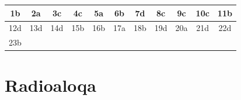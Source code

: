 \begin{table}[!ht]
\centering
\begin{tabular}{|c|c|c|c|c|c|c|c|c|c|c|}
\hline
1b & 2a & 3c & 4c & 5a & 6b & 7d & 8c & 9c & 10c & 11b \\ \hline
12d & 13d & 14d & 15b & 16b & 17a & 18b & 19d & 20a & 21d & 22d \\ \hline
23b & & & & & & & & & & \\ \hline
\end{tabular}
\end{table}













\section{Radioaloqa}

